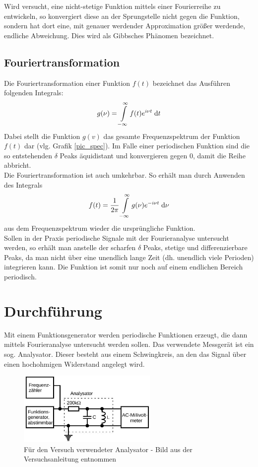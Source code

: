 Wird versucht, eine nicht-stetige Funktion mittels einer Fourierreihe zu entwickeln, so konvergiert diese an der Sprungstelle nicht gegen die Funktion, sondern hat dort eine, mit genauer werdender Approximation größer werdende, endliche Abweichung. Dies wird als Gibbsches Phänomen bezeichnet.

\subsection{Fouriertransformation}
Die Fouriertransformation einer Funktion $f(t)$ bezeichnet das Ausführen folgenden Integrals:
\begin{align}
g(\nu) = \int \limits _{-\infty}^\infty f(t) e^{i\nu t} \; \mathrm{d} t
\label{eq_ftrafo}
\end{align}
Dabei stellt die Funktion $g(v)$ das gesamte Frequenzspektrum der Funktion $f(t)$ dar (vlg. Grafik \ref{pic_spec}). Im Falle einer periodischen Funktion sind die so entstehenden $\delta$ Peaks äquidistant und konvergieren gegen 0, damit die Reihe abbricht.\\

Die Fouriertransformation ist auch umkehrbar. So erhält man durch Anwenden des Integrals
\begin{align}
f(t) = \frac{1}{2\pi} \int \limits ^\infty _{-\infty} g(\nu) e^{-i\nu t} \; \mathrm{d} \nu
\label{eq-ruecktrafo}
\end{align}
aus dem Frequenzspektrum wieder die ursprüngliche Funktion.\\

Sollen in der Praxis periodische Signale mit der Fourieranalyse untersucht werden, so erhält man anstelle der scharfen $\delta$ Peaks, stetige und differenzierbare Peaks, da man nicht über eine unendlich lange Zeit (dh. unendlich viele Perioden) integrieren kann. Die Funktion ist somit nur noch auf einem endlichen Bereich periodisch. 

\section{Durchführung}
Mit einem Funktionsgenerator werden periodische Funktionen erzeugt, die dann mittels Fourieranalyse untersucht werden sollen. Das verwendete Messgerät ist ein sog. Analysator. Dieser besteht aus einem Schwingkreis, an den das Signal über einen hochohmigen Widerstand angelegt wird. 
\begin{figure}[htbp]
\includegraphics[width=0.6\textwidth]{pics/analysator.jpeg}
\caption{Für den Versuch verwendeter Analysator - Bild aus der Versuchsanleitung entnommen}
\end{figure}

